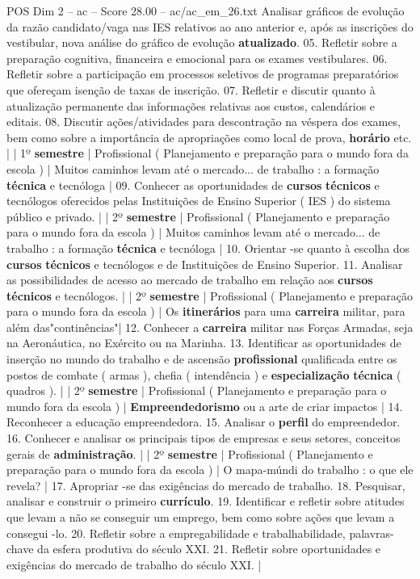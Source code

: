 \begin{textsample}{POS Dim 2 – ac – Score 28.00 – ac/ac\_em\_26.txt}
Analisar gráficos de evolução da razão candidato/vaga nas IES relativos ao ano anterior e, após as inscrições do vestibular, nova análise do gráfico de evolução \textbf{atualizado}. 05.
Refletir sobre a preparação cognitiva, financeira e emocional para os exames vestibulares. 06.
Refletir sobre a participação em processos seletivos de programas preparatórios que ofereçam isenção de taxas de inscrição. 07.
Refletir e discutir quanto à atualização permanente das informações relativas aos custos, calendários e editais. 08.
Discutir ações/atividades para descontração na véspera dos exames, bem como sobre a importância de apropriações como local de prova, \textbf{horário} etc. | | 1º \textbf{semestre} | Profissional ( Planejamento e preparação para o mundo fora da escola ) | Muitos caminhos levam até o mercado... de trabalho : a formação \textbf{técnica} e tecnóloga | 09.
Conhecer as oportunidades de \textbf{cursos} \textbf{técnicos} e tecnólogos oferecidos pelas Instituições de Ensino Superior ( IES ) do sistema público e privado. | | 2º \textbf{semestre} | Profissional ( Planejamento e preparação para o mundo fora da escola ) | Muitos caminhos levam até o mercado... de trabalho : a formação \textbf{técnica} e tecnóloga | 10.
Orientar -se quanto à escolha dos \textbf{cursos} \textbf{técnicos} e tecnólogos e de Instituições de Ensino Superior. 11.
Analisar as possibilidades de acesso ao mercado de trabalho em relação aos \textbf{cursos} \textbf{técnicos} e tecnólogos. | | 2º \textbf{semestre} | Profissional ( Planejamento e preparação para o mundo fora da escola ) | Os \textbf{itinerários} para uma \textbf{carreira} militar, para além das"continências"| 12.
Conhecer a \textbf{carreira} militar nas Forças Armadas, seja na Aeronáutica, no Exército ou na Marinha. 13.
Identificar as oportunidades de inserção no mundo do trabalho e de ascensão \textbf{profissional} qualificada entre os postos de combate ( armas ), chefia ( intendência ) e \textbf{especialização} \textbf{técnica} ( quadros ). | | 2º \textbf{semestre} | Profissional ( Planejamento e preparação para o mundo fora da escola ) | \textbf{Empreendedorismo} ou a arte de criar impactos | 14.
Reconhecer a educação empreendedora. 15.
Analisar o \textbf{perfil} do empreendedor. 16.
Conhecer e analisar os principais tipos de empresas e seus setores, conceitos gerais de \textbf{administração}. | | 2º \textbf{semestre} | Profissional ( Planejamento e preparação para o mundo fora da escola ) | O mapa-múndi do trabalho : o que ele revela? | 17.
Apropriar -se das exigências do mercado de trabalho. 18.
Pesquisar, analisar e construir o primeiro \textbf{currículo}. 19.
Identificar e refletir sobre atitudes que levam a não se conseguir um emprego, bem como sobre ações que levam a consegui -lo. 20.
Refletir sobre a empregabilidade e trabalhabilidade, palavras-chave da esfera produtiva do século XXI. 21.
Refletir sobre oportunidades e exigências do mercado de trabalho do século XXI. |


\end{textsample}
